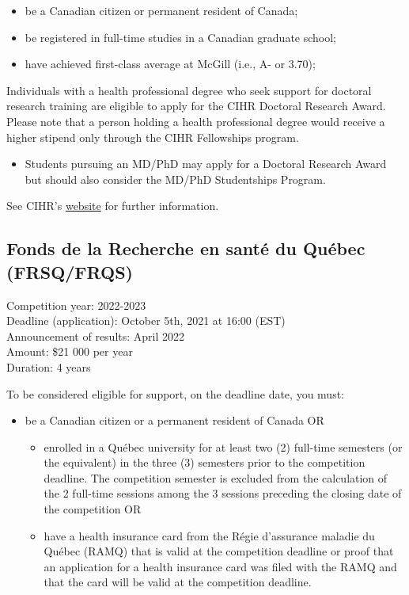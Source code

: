 \documentclass[
  openany]{book}
\providecommand{\tightlist}{%
  \setlength{\itemsep}{0pt}\setlength{\parskip}{0pt}}
\begin{document}
\begin{itemize}
\tightlist
\item
  be a Canadian citizen or permanent resident of Canada;
\item
  be registered in full-time studies in a Canadian graduate school;
\item
  have achieved first-class average at McGill (i.e., A- or 3.70);
\end{itemize}

Individuals with a health professional degree who seek support for doctoral research training are eligible to apply for the CIHR Doctoral Research Award. Please note that a person holding a health professional degree would receive a higher stipend only through the CIHR Fellowships program.

\begin{itemize}
\tightlist
\item
  Students pursuing an MD/PhD may apply for a Doctoral Research Award but should also consider the MD/PhD Studentships Program.
\end{itemize}

See CIHR's \href{www.cihr-irsc.gc.ca}{website} for further information.

\hypertarget{fonds-de-la-recherche-en-santuxe9-du-quuxe9bec-frsqfrqs}{%
\subsection{Fonds de la Recherche en santé du Québec (FRSQ/FRQS)}\label{fonds-de-la-recherche-en-santuxe9-du-quuxe9bec-frsqfrqs}}

Competition year: 2022-2023\\
Deadline (application): October 5th, 2021 at 16:00 (EST)\\
Announcement of results: April 2022\\
Amount: \$21 000 per year\\
Duration: 4 years

To be considered eligible for support, on the deadline date, you must:

\begin{itemize}
\tightlist
\item
  be a Canadian citizen or a permanent resident of Canada OR

  \begin{itemize}
  \tightlist
  \item
    enrolled in a Québec university for at least two (2) full-time semesters (or the equivalent) in the three (3) semesters prior to the competition deadline. The competition semester is excluded from the calculation of the 2 full-time sessions among the 3 sessions preceding the closing date of the competition OR
  \item
    have a health insurance card from the Régie d'assurance maladie du Québec (RAMQ) that is valid at the competition deadline or proof that an application for a health insurance card was filed with the RAMQ and that the card will be valid at the competition deadline.
  \end{itemize}
\end{itemize}
\end{document}
